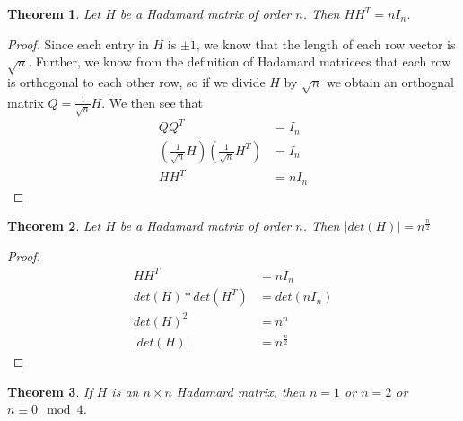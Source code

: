\documentclass{article}
\newtheorem{theorem}{Theorem}[section]
\theoremstyle{definition}
\begin{document}
\begin{theorem}
Let $H$ be a Hadamard matrix of order $n$. Then $HH^T = nI_n$.
\end{theorem}

\begin{proof}
Since each entry in $H$ is $\pm 1$, we know that the length of each row vector is $\sqrt{n}$. Further, we know from the definition of Hadamard matricecs that each row is orthogonal to each other row, so if we divide $H$ by $\sqrt n$ we obtain an orthognal matrix $Q = \frac{1}{\sqrt n} H$. We then see that
\begin{align*}
  QQ^T &= I_n\\
  \left(\frac{1}{\sqrt n} H\right)\left(\frac{1}{\sqrt n} H^T\right) &= I_n\\
  HH^T &= nI_n
\end{align*}
\end{proof}

\begin{theorem}
Let $H$ be a Hadamard matrix of order $n$. Then $|det(H)| = n^{\frac n 2}$
\end{theorem}

\begin{proof}
  \begin{align*}
    HH^T &= nI_n \\
    det(H) * det(H^T) &= det(nI_n) \\
    det(H)^2 &= n^n\\
    |det(H)| &= n^{\frac n 2}
  \end{align*}
\end{proof}

\begin{theorem}
If $H$ is an $n \times n$ Hadamard matrix, then $n = 1$ or $n = 2$ or $n \equiv 0 \mod 4$.
\end{theorem}
\end{document}
